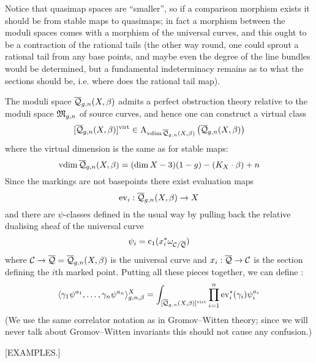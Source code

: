 \begin{remark}
 Notice that quasimap spaces are ``smaller'', so if a comparison morphism exists it should be from stable maps to quasimaps; in fact a morphism between the moduli spaces comes with a morphism of the universal curves, and this ought to be a contraction of the rational tails (the other way round, one could sprout a rational tail from any base points, and maybe even the degree of the line bundles would be determined, but a fundamental indeterminacy remains as to what the sections should be, i.e. where does the rational tail map).
\end{remark}

The moduli space $\overline{\mathcal Q}_{g,n}(X,\beta)$ admits a perfect obstruction theory relative to the moduli space $\mathfrak M_{g,n}$ of source curves, and hence one can construct a virtual class
\begin{equation*} [\overline{\mathcal Q}_{g,n}(X,\beta)]^{\operatorname{virt}} \in \operatorname{A}_{\operatorname{vdim}\overline{\mathcal Q}_{g,n}(X,\beta)} \left( \overline{\mathcal Q}_{g,n}(X,\beta) \right) \end{equation*}
where the virtual dimension is the same as for stable maps:
\begin{equation*} \operatorname{vdim}\overline{\mathcal Q}_{g,n}(X,\beta) = (\dim{X} - 3)(1-g) - (K_X \cdot \beta) + n \end{equation*}
Since the markings are not basepoints there exist evaluation maps
\begin{equation*} \operatorname{ev}_i : \overline{\mathcal Q}_{g,n}(X,\beta) \rightarrow X \end{equation*}
and there are $\psi$-classes defined in the usual way by pulling back the relative dualising sheaf of the universal curve
\begin{equation*} \psi_i = \operatorname{c}_1(x_i^* \omega_{\mathcal{C}/\overline{\mathcal{Q}}}) \end{equation*}
where $\mathcal{C} \rightarrow \overline{\mathcal{Q}} = \overline{\mathcal Q}_{g,n}(X,\beta)$ is the universal curve and $x_i : \overline{\mathcal{Q}} \rightarrow \mathcal{C}$ is the section defining the $i$th marked point. Putting all these pieces together, we can define :
\begin{equation*} \langle \gamma_1 \psi^{a_1} , \ldots, \gamma_n \psi^{a_n} \rangle_{g,n,\beta}^X = \int_{[\overline{\mathcal Q}_{g,n}(X,\beta)]^{\operatorname{virt}}} \prod_{i=1}^n \operatorname{ev}_i^* (\gamma_i) \psi_i^{a_i} \end{equation*}
(We use the same correlator notation as in Gromov--Witten theory; since we will never talk about Gromov--Witten invariants this should not cause any confusion.)

[EXAMPLES.]

